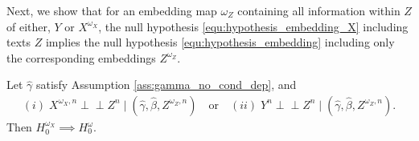 \documentclass[twoside,11pt]{article}
\newcommand{\indep}{\perp \!\!\! \perp}
\begin{document}
Next, we show that for an embedding map $\omega_Z$ containing all information within $Z$ of either, $Y$ or $X^{\omega_X}$, the null hypothesis \eqref{equ:hypothesis_embedding_X} including texts $Z$ implies the null hypothesis \eqref{equ:hypothesis_embedding} including only the corresponding embeddings $Z^{\omega_Z}$. 
\begin{theoremE}\label{thm:text0_implies_emb0_Z}
    Let $\hat{\gamma}$ satisfy Assumption \ref{ass:gamma_no_cond_dep}, and
    \begin{align*}
        (i) \; X^{\omega_X,n}\indep Z^n\mid (\hat{\gamma}, \hat{\beta},Z^{\omega_Z,n})\quad \text{or} \quad (ii)\;  Y^n\indep Z^n\mid (\hat{\gamma}, \hat{\beta},Z^{\omega_Z,n}).
    \end{align*} 
    Then $H_0^{\omega_X}\implies H_0^{\omega}$.
\end{theoremE}
\end{document}
